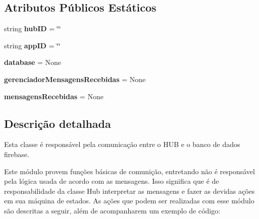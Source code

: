 \subsection*{Atributos Públicos Estáticos}
\begin{DoxyCompactItemize}
\item 
string {\bfseries hub\+ID} = \char`\"{}\char`\"{}\hypertarget{classhub_para_firebase_1_1_hub_para_firebase_a877a7af6deac7745ca493313cc812936}{}\label{classhub_para_firebase_1_1_hub_para_firebase_a877a7af6deac7745ca493313cc812936}

\item 
string {\bfseries app\+ID} = \char`\"{}\char`\"{}\hypertarget{classhub_para_firebase_1_1_hub_para_firebase_a1151963c2e4dea5ea944b2082a629a07}{}\label{classhub_para_firebase_1_1_hub_para_firebase_a1151963c2e4dea5ea944b2082a629a07}

\item 
{\bfseries database} = None\hypertarget{classhub_para_firebase_1_1_hub_para_firebase_ad897e9d2142426f09b8154ae0e0ab374}{}\label{classhub_para_firebase_1_1_hub_para_firebase_ad897e9d2142426f09b8154ae0e0ab374}

\item 
{\bfseries gerenciador\+Mensagens\+Recebidas} = None\hypertarget{classhub_para_firebase_1_1_hub_para_firebase_ae5cbb5c32dda53f7f6a6c1b5685d2815}{}\label{classhub_para_firebase_1_1_hub_para_firebase_ae5cbb5c32dda53f7f6a6c1b5685d2815}

\item 
{\bfseries mensagens\+Recebidas} = None\hypertarget{classhub_para_firebase_1_1_hub_para_firebase_aed56c55b4e098c7c77ffee2759801901}{}\label{classhub_para_firebase_1_1_hub_para_firebase_aed56c55b4e098c7c77ffee2759801901}

\end{DoxyCompactItemize}


\subsection{Descrição detalhada}
Esta classe é responsável pela comunicação entre o H\+UB e o banco de dados firebase. 

Este módulo provem funções básicas de comunição, entretando não é responsável pela lógica usada de acordo com as mensagens. Isso significa que é de responsabilidade da classe Hub interpretar as mensagens e fazer as devidas ações em sua máquina de estados. As ações que podem ser realizadas com esse módulo são descritas a seguir, além de acompanharem um exemplo de código\+:

